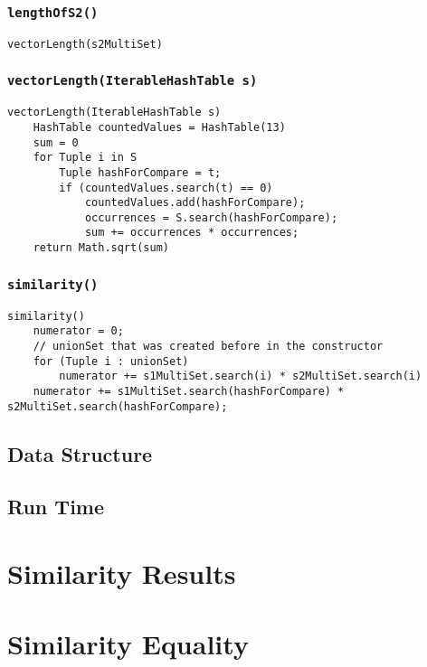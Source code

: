 \documentclass[10pt,letterpaper]{article}
\begin{document}
\subsubsection{\texttt{lengthOfS2()}}
\begin{verbatim}
vectorLength(s2MultiSet)
\end{verbatim}
\subsubsection{\texttt{vectorLength(IterableHashTable s)}}
\begin{verbatim}
vectorLength(IterableHashTable s)
    HashTable countedValues = HashTable(13)
    sum = 0
    for Tuple i in S
        Tuple hashForCompare = t;
        if (countedValues.search(t) == 0)
            countedValues.add(hashForCompare);
            occurrences = S.search(hashForCompare);
            sum += occurrences * occurrences;
    return Math.sqrt(sum)
\end{verbatim}
\subsubsection{\texttt{similarity()}}
\begin{verbatim}
similarity()
    numerator = 0;
    // unionSet that was created before in the constructor
    for (Tuple i : unionSet)
        numerator += s1MultiSet.search(i) * s2MultiSet.search(i)
    numerator += s1MultiSet.search(hashForCompare) * s2MultiSet.search(hashForCompare);
\end{verbatim}
\subsection{Data Structure }
\subsection{Run Time}
\section{Similarity Results}
\section{Similarity Equality}
\end{document}
